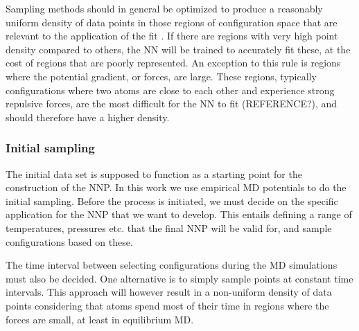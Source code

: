 \documentclass[twoside,english]{uiofysmaster}
\begin{document}
Sampling methods should in general be optimized to produce a reasonably uniform density of 
data points in those regions of configuration space that are relevant to the application of the fit \cite{Raff12}. 
If there are regions with very high point density compared to others, the NN will be trained to accurately fit these, 
at the cost of regions that are poorly represented. An exception to this rule is regions where the potential gradient, or forces, 
are large. These regions, typically configurations where two atoms are close to each other and experience strong
repulsive forces, are the most difficult for the NN to fit (REFERENCE?), 
and should therefore have a higher density. 

\subsubsection{Initial sampling}
The initial data set is supposed to function as a starting point for the construction of the NNP. 
In this work we use empirical MD potentials to do the initial sampling. Before the process is initiated, 
we must decide on the specific application for the NNP that we want to develop. This entails 
defining a range of temperatures, pressures etc. that the final NNP will be valid for, and sample
configurations based on these. 

The time interval between selecting configurations during the MD simulations must also be decided. 
One alternative is to simply sample points at constant time intervals. This approach will
however result in a non-uniform density of data points considering that atoms spend most of their time
in regions where the forces are small, at least in equilibrium MD. 
\end{document}
